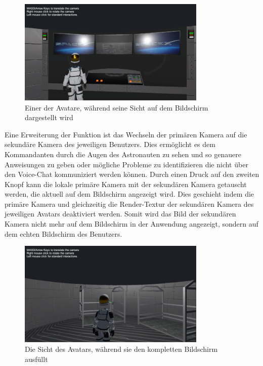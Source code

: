 \begin{figure}[H]
\centering
\includegraphics[width=0.8\textwidth]{VirgosScreenview.PNG}
\caption{Einer der Avatare, während seine Sicht auf dem Bildschirm dargestellt wird}
\end{figure}

\newpage

Eine Erweiterung der Funktion ist das Wechseln der primären Kamera auf die sekundäre Kamera des jeweiligen Benutzers. Dies ermöglicht es dem Kommandanten durch die Augen des Astronauten zu sehen und so genauere Anweisungen zu geben oder mögliche Probleme zu identifizieren die nicht über den Voice-Chat kommuniziert werden können. Durch einen Druck auf den zweiten Knopf kann die lokale primäre Kamera mit der sekundären Kamera getauscht werden, die aktuell auf dem Bildschirm angezeigt wird. Dies geschieht indem die primäre Kamera und gleichzeitig die Render-Textur der sekundären Kamera des jeweiligen Avatars deaktiviert werden. Somit wird das Bild der sekundären Kamera nicht mehr auf dem Bildschirm in der Anwendung angezeigt, sondern auf dem echten Bildschirm des Benutzers. 

\begin{figure}[H]
\centering
\includegraphics[width=0.8\textwidth]{ScreenDuplicate.PNG}
\caption{Die Sicht des Avatars, während sie den kompletten Bildschirm ausfüllt}
\end{figure}

